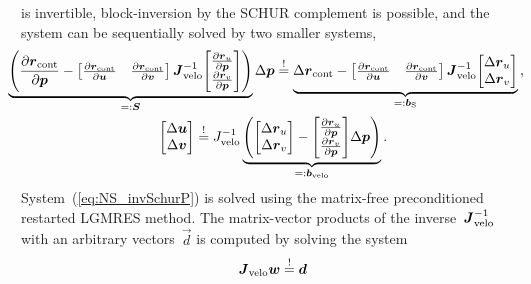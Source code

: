 \documentclass[10pt, ngerman, english,
twoside, open=right,
numbers=noenddot,
declaration=section,
abstract=section,
abstract=multiple,
abstract=notoc,
declaration=notoc,
cd=pale, 
chapterprefix=off, 
chapterpage=false, 
headingsvskip=-10em,
cdgeometry=custom, 
slantedgreek=on,
cdmath=on, 
cdfont=on,
ttfont=false,
mathswap=off,
]{tudscrreprt}
\numberwithin{equation}{chapter}
\renewcommand{\textsc}[1]{\uppercase{\mbox{#1}}}
\begin{document}
is invertible, block-inversion by the \textsc{Schur} complement is possible, and the system can be sequentially solved by two smaller systems,
\begin{subequations}\begin{gather}
\hspace*{-1em}\underbrace{\left( 
\pdiff{\vec{r}_\text{cont}}{\vec{p}} - 
\begin{bmatrix} \pdiff{\vec{r}_\text{cont}}{\vec{u}} & \pdiff{\vec{r}_\text{cont}}{\vec{v}} \end{bmatrix}\,
\mat J_\text{velo}^{-1}
\begin{bmatrix} \pdiff{\vec{r}_u}{\vec{p}} \\ \pdiff{\vec{r}_v}{\vec{p}} \end{bmatrix} 
\right)}_{=: \mat S} \Delta\vec{p} 
\overset!= 
\underbrace{\Delta\vec{r}_\text{cont} - 
\begin{bmatrix} \pdiff{\vec{r}_\text{cont}}{\vec{u}} & \pdiff{\vec{r}_\text{cont}}{\vec{v}} \end{bmatrix}\,
\mat J_\text{velo}^{-1} 
\begin{bmatrix} \Delta\vec{r}_u \\ \Delta\vec{r}_v \end{bmatrix}}_{=: \vec{b}_\text{S}}\text{,}\label{eq:NS_invSchurP} \\
\begin{bmatrix}\Delta\vec{u} \\ \Delta\vec{v} \end{bmatrix} \overset!= J_\text{velo}^{-1} \underbrace{\left( 
\begin{bmatrix} \Delta\vec{r}_u \\ \Delta\vec{r}_v \end{bmatrix} - 
\begin{bmatrix} \pdiff{\vec{r}_u}{\vec{p}} \\ \pdiff{\vec{r}_v}{\vec{p}} \end{bmatrix} \Delta\vec{p}
\right)}_{=:\vec{b}_\text{velo}}\text{.}\label{eq:NS_invSchurVelo}
\end{gather}\end{subequations}
System~(\ref{eq:NS_invSchurP}) is solved using the matrix-free preconditioned restarted LGMRES method. 
The matrix-vector products of the inverse~$\boldsymbol{J}_\text{velo}^{-1}$ with an arbitrary vectors~$\vec{d}$ is computed by solving the system
\begin{equation}
\boldsymbol{J}_\text{velo} \boldsymbol{w} \overset!= \boldsymbol{d} \label{eq:NS_invJacVelo}
\end{equation}
\end{document}
